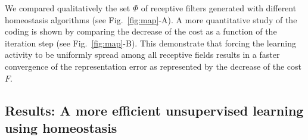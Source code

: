 \documentclass[vision,article,submit,oneauthor,pdftex]{Definitions/mdpi}
\newcommand{\dico}{\Phi} %
\newcommand{\seeFig}[1]{Figure~\ref{fig:#1}}%
\begin{document}
We compared qualitatively the set $\dico$ of receptive filters generated with different homeostasis algorithms (see Fig.~\ref{fig:map}-A). A more quantitative study of the coding is shown by comparing the decrease of the cost as a function of the iteration step (see Fig.~\ref{fig:map}-B). This demonstrate that forcing the learning activity to be uniformly spread among all receptive fields results in a faster convergence of the representation error as represented by the decrease of the cost $F$. %
\subsection{Results: A more efficient unsupervised learning using homeostasis}\label{results}
\end{document}

